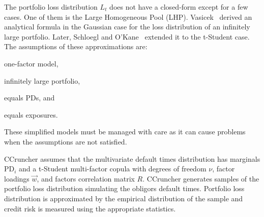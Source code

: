 \documentclass[11pt,fleqn]{book} %
\begin{document}
The portfolio loss distribution $L_t$ does not have a closed-form except 
for a few cases. One of them is the Large Homogeneous Pool (LHP).
Vasicek~\cite{vasicek:1987} derived an analytical formula in the Gaussian 
case for the loss distribution of an infinitely large portfolio. Later, 
Schloegl and O'Kane~\cite{schloegl:2005} extended it to the t-Student 
case. The assumptions of these approximations are: 
\begin{inparaenum}[1)]
	\item one-factor model, 
	\item infinitely large portfolio, 
	\item equals PDs, and
	\item equals exposures.
\end{inparaenum}
These simplified models must be managed 
with care as it can cause problems~\cite{long:2012} when the assumptions 
are not satisfied.

CCruncher assumes that the multivariate default times distribution has
marginals $\text{PD}_i$ and a t-Student multi-factor copula with degrees 
of freedom $\nu$, factor loadings $\vec{w}$, and factors correlation matrix 
$R$. CCruncher generates samples of the portfolio loss distribution simulating 
the obligors default times. Portfolio loss distribution is approximated by the 
empirical distribution of the sample and credit risk is measured using the 
appropriate statistics.
\end{document}
